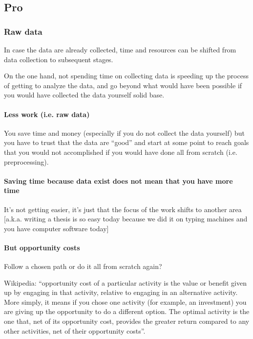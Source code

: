 \subsection{Pro}




\subsubsection{Raw data}

%
In case the data are already collected, time and resources can be shifted from
data collection to subsequent stages.

%
On the one hand, not spending time on collecting data is speeding up the process
of getting to analyze the data, and go beyond what would have been possible if
you would have collected the data yourself solid base.



\paragraph{Less work (i.e. raw data)}
%
You save time and money (especially if you do not collect the data yourself) but
you have to trust that the data are ``good'' and start at some point to reach
goals that you would not accomplished if you would have done all from scratch
(i.e. preprocessing).


\paragraph{Saving time because data exist does not mean that you have more time}

%
It's not getting easier, it's just that the focus of the work shifts to another
area [a.k.a. writing a thesis is so easy today because we did it on typing
machines and you have computer software today]



\paragraph{But opportunity costs}

%
Follow a chosen path or do it all from scratch again?

Wikipedia: ``opportunity cost of a particular activity is the value or benefit
given up by engaging in that activity, relative to engaging in an alternative
activity.
%
More simply, it means if you chose one activity (for example, an investment) you
are giving up the opportunity to do a different option.
%
The optimal activity is the one that, net of its opportunity cost, provides the
greater return compared to any other activities, net of their opportunity
costs''.

